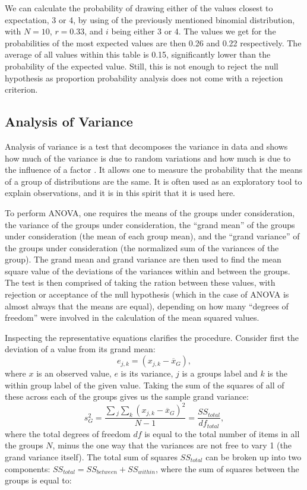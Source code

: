 We can calculate the probability of drawing either of the values closest
to expectation, 3 or 4, by using of the previously mentioned binomial distribution,
with $N = 10$, $r = 0.33$, and $i$ being either 3 or 4. The values we get for
the probabilities of the most expected values are then 0.26 and 0.22
respectively. The average of all values within this table is
0.15, significantly lower than the probability of the expected value.
Still, this is not enough to reject the null hypothesis as proportion
probability analysis does not come with a rejection criterion.

\subsection{Analysis of Variance}
Analysis of variance is a test that decomposes the variance in data and shows
how much of the variance is due to random variations and how much is due to the influence
of a factor \cite{Cohen}. It allows one to measure the probability that the means
of a group of distributions are the same. It is often used as an exploratory tool
to explain observations, and it is in this spirit that it is used here.

To perform ANOVA, one requires the means of the groups under consideration, the
variance of the groups under consideration, the ``grand  mean'' of the groups
under consideration (the mean of each group mean), and the ``grand variance''
of the groups under consideration (the normalized sum of the variances of the
group). The grand mean and grand variance are then used to find the mean square
value of the deviations of the variances within and between the groups. The
test is then comprised of taking the ration between these values, with rejection
or acceptance of the null hypothesis (which in the case of ANOVA is almost always that
the means are equal), depending on how many ``degrees of freedom'' were
involved in the calculation of the mean squared values.

Inspecting the representative equations clarifies the procedure. Consider first
the deviation of a value from its grand mean:
$$e_{j,k} = (x_{j,k} - \overline{x}_{G}),$$
where $x$ is an observed value, $e$ is its variance, $j$ is a groups label
and $k$ is the within group label of the given value. Taking the sum of the
squares of all of these across each of the groups gives us the sample grand
variance:
$$s_{G}^{2} = \frac{\sum{}_{j}\sum_{k}{(x_{j,k} - \overline{x}_{G})^{2}}}{N-1} = \frac{SS_{total}}{df_{total}},$$
where the total degrees of freedom $df$ is equal to the total number of items in
all the groups $N$, minus the one way that the variances are not free to vary 1
(the grand variance itself). The total sum of squares $SS_{total}$ can be broken
up into two components: $SS_{total} = SS_{between} + SS_{within}$, where the sum
of squares between the groups is equal to:

